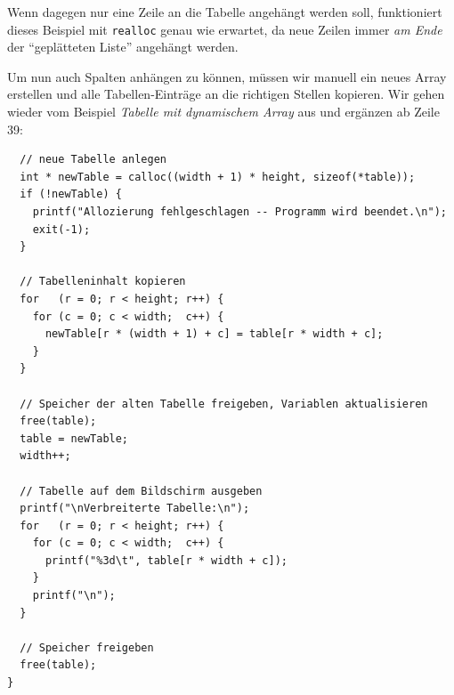 \begin{tcolorbox}[title=Visualisierung: Abbild der Tabelle im Speicher]
\end{tcolorbox}

Wenn dagegen nur eine Zeile an die Tabelle angehängt werden soll, funktioniert dieses Beispiel mit \texttt{realloc} genau wie erwartet, da neue Zeilen immer \emph{am Ende} der \enquote{geplätteten Liste} angehängt werden.

Um nun auch Spalten anhängen zu können, müssen wir manuell ein neues Array erstellen und alle Tabellen-Einträge an die richtigen Stellen kopieren. Wir gehen wieder vom Beispiel \emph{Tabelle mit dynamischem Array} aus und ergänzen ab Zeile 39:

\begin{codebox}
\begin{verbatim}
  // neue Tabelle anlegen
  int * newTable = calloc((width + 1) * height, sizeof(*table));
  if (!newTable) {
    printf("Allozierung fehlgeschlagen -- Programm wird beendet.\n");
    exit(-1);
  }

  // Tabelleninhalt kopieren
  for   (r = 0; r < height; r++) {
    for (c = 0; c < width;  c++) {
      newTable[r * (width + 1) + c] = table[r * width + c];
    }
  }

  // Speicher der alten Tabelle freigeben, Variablen aktualisieren
  free(table);
  table = newTable;
  width++;

  // Tabelle auf dem Bildschirm ausgeben
  printf("\nVerbreiterte Tabelle:\n");
  for   (r = 0; r < height; r++) {
    for (c = 0; c < width;  c++) {
      printf("%3d\t", table[r * width + c]);
    }
    printf("\n");
  }

  // Speicher freigeben
  free(table);
}
\end{verbatim}
\end{codebox}

